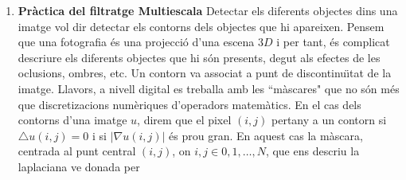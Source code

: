 \documentclass[11pt]{article}
\begin{document}
\begin{enumerate}
\item
{\bf Pr\`{a}ctica del filtratge Multiescala} Detectar els diferents objectes dins una imatge vol dir
detectar els contorns dels objectes que hi apareixen. Pensem que una fotografia \'{e}s una projecci\'{o}
d'una escena $3D$ i per tant, \'{e}s complicat descriure els diferents objectes que hi s\'{o}n presents,
degut als efectes de les oclusions, ombres, etc. Un contorn va associat a punt de discontinu\"{\i}tat de
la imatge. Llavors, a nivell digital es treballa amb les ``m\`{a}scares" que no s\'{o}n m\'{e}s que
discretizacions num\`{e}riques d'operadors matem\`{a}tics. En el cas dels contorns d'una imatge $u$, direm
que el pixel $(i,j)$ pertany a un contorn si $\triangle u(i,j)=0$ i si $|\nabla u(i,j)|$ \'{e}s prou
gran. En aquest cas la m\`{a}scara, centrada al punt central $(i,j)$, on $i,j \in 0,1,\ldots,N$, que
ens descriu la laplaciana ve donada per


\end{enumerate}
\end{document}
